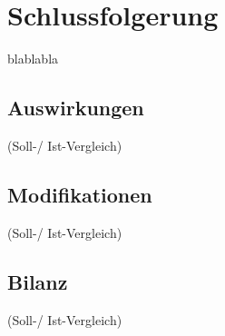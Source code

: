 \section{Schlussfolgerung}
\label{sec:description:schlussfolgerung}
blablabla

\subsection{Auswirkungen}
\label{subsec:description:auswirkungen}
(Soll-/ Ist-Vergleich)

\subsection{Modifikationen}
\label{subsec:description:modifikationen}
(Soll-/ Ist-Vergleich)

\subsection{Bilanz}
\label{subsec:description:bilanz}
(Soll-/ Ist-Vergleich)
